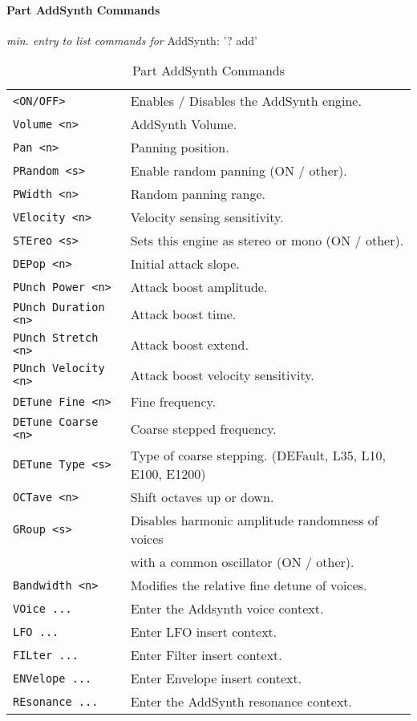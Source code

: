 \paragraph{Part AddSynth Commands}
\textsl{min. entry to list commands for} AddSynth: '? add'
\label{paragraph:command_line_part_addsynth_commands}
   \begin{table}[H]
      \centering
      \caption{Part AddSynth Commands}
      \label{table:yoshimi_part_addsynth_commands}
      \begin{tabular}{l l}
\texttt{<ON/OFF>} &
   Enables / Disables the AddSynth engine. \\
\texttt{Volume <n>} &
   AddSynth Volume.  \\
\texttt{Pan <n>} &
   Panning position.\\
\texttt{PRandom <s>} &
   Enable random panning (ON / other).\\
\texttt{PWidth <n>} &
   Random panning range.\\
\texttt{VElocity <n>} &
   Velocity sensing sensitivity. \\
\texttt{STEreo <s>} &
   Sets this engine as stereo or mono (ON / other). \\
\texttt{DEPop <n>} &
   Initial attack slope.   \\
\texttt{PUnch Power <n>} &
   Attack boost amplitude. \\
\texttt{PUnch Duration <n>} &
   Attack boost time.   \\
\texttt{PUnch Stretch <n>} &
   Attack boost extend. \\
\texttt{PUnch Velocity <n>} &
   Attack boost velocity sensitivity.  \\
\texttt{DETune Fine <n>} &
   Fine frequency.   \\
\texttt{DETune Coarse <n>} &
   Coarse stepped frequency.  \\
\texttt{DETune Type <s>} &
   Type of coarse stepping. (DEFault, L35, L10, E100, E1200)  \\
\texttt{OCTave <n>} &
   Shift octaves up or down.  \\
\texttt{GRoup <s>} &
   Disables harmonic amplitude randomness of voices \\
\texttt{ } &
             with a common oscillator (ON / other). \\
\texttt{Bandwidth <n>} &
   Modifies the relative fine detune of voices. \\
\texttt{VOice ...} &
   Enter the Addsynth voice context. \\
\texttt{LFO ...} &
   Enter LFO insert context.  \\
\texttt{FILter ...} &
   Enter Filter insert context.  \\
\texttt{ENVelope ...} &
   Enter Envelope insert context.   \\
\texttt{REsonance ...} &
   Enter the AddSynth resonance context. \\
      \end{tabular}
   \end{table}
